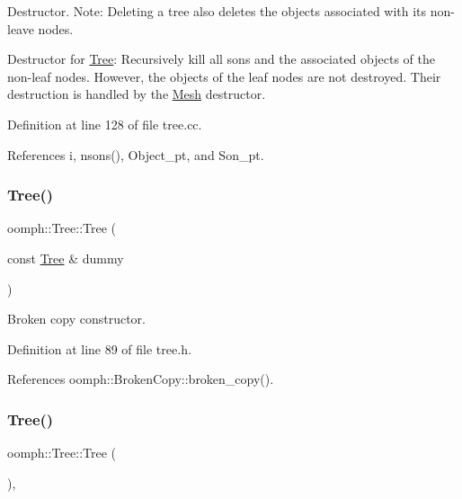 Destructor. Note\+: Deleting a tree also deletes the objects associated with its non-\/leave nodes. 

Destructor for \hyperlink{classoomph_1_1Tree}{Tree}\+: Recursively kill all sons and the associated objects of the non-\/leaf nodes. However, the objects of the leaf nodes are not destroyed. Their destruction is handled by the \hyperlink{classoomph_1_1Mesh}{Mesh} destructor. 

Definition at line 128 of file tree.\+cc.



References i, nsons(), Object\+\_\+pt, and Son\+\_\+pt.

\mbox{\label{classoomph_1_1Tree_af14116bedf82f96556877c475c73c6e3}} 
\subsubsection{\texorpdfstring{Tree()}{Tree()}\hspace{0.1cm}{\footnotesize\ttfamily [1/4]}}
{\footnotesize\ttfamily oomph\+::\+Tree\+::\+Tree (\begin{DoxyParamCaption}\item[{const \hyperlink{classoomph_1_1Tree}{Tree} \&}]{dummy }\end{DoxyParamCaption})\hspace{0.3cm}{\ttfamily [inline]}}



Broken copy constructor. 



Definition at line 89 of file tree.\+h.



References oomph\+::\+Broken\+Copy\+::broken\+\_\+copy().

\mbox{\label{classoomph_1_1Tree_ada92f1aa44ee6ef5b52ec5ad0af00359}} 
\subsubsection{\texorpdfstring{Tree()}{Tree()}\hspace{0.1cm}{\footnotesize\ttfamily [2/4]}}
{\footnotesize\ttfamily oomph\+::\+Tree\+::\+Tree (\begin{DoxyParamCaption}{ }\end{DoxyParamCaption})\hspace{0.3cm}{\ttfamily [inline]}, {\ttfamily [protected]}}



